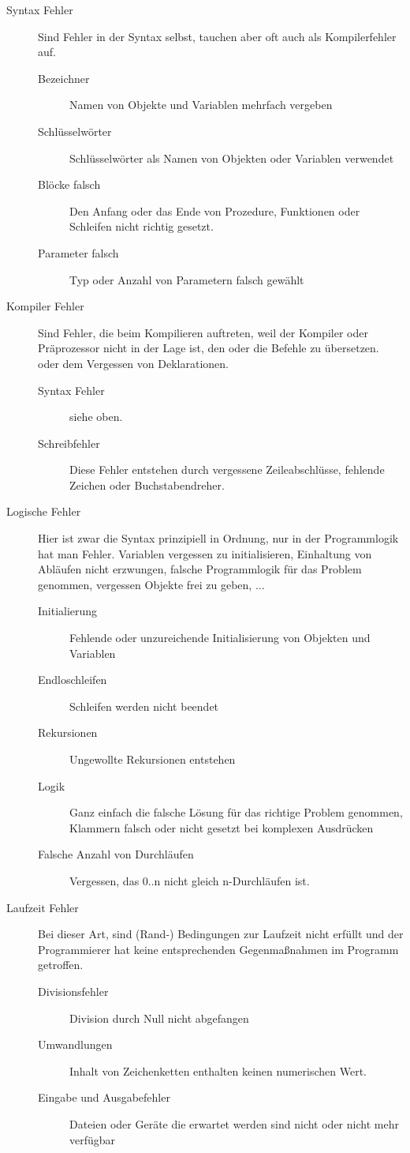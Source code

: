 \begin{description}
  \item[Syntax Fehler] Sind Fehler in der Syntax selbst, tauchen aber oft auch als Kompilerfehler auf.
  \begin{description}
	  \item[Bezeichner] Namen von Objekte und Variablen mehrfach vergeben
	  \item[Schlüsselwörter] Schlüsselwörter als Namen von Objekten oder Variablen verwendet
	  \item[Blöcke falsch] Den Anfang oder das Ende von Prozedure, Funktionen oder Schleifen nicht richtig gesetzt.
	  \item[Parameter falsch] Typ oder Anzahl von Parametern falsch gewählt     
  \end{description}
	\item[Kompiler Fehler] Sind Fehler, die beim Kompilieren auftreten, weil der Kompiler oder Präprozessor nicht in der Lage ist, den oder die Befehle zu übersetzen.  oder dem Vergessen von Deklarationen.
  \begin{description}
	  \item[Syntax Fehler] siehe oben.
	  \item[Schreibfehler] Diese Fehler entstehen durch vergessene Zeileabschlüsse, fehlende Zeichen oder Buchstabendreher.
  \end{description}
  \item[Logische Fehler] Hier ist zwar die Syntax prinzipiell in Ordnung, nur in der Programmlogik hat man Fehler. Variablen vergessen zu initialisieren, Einhaltung von Abläufen nicht erzwungen, falsche Programmlogik für das Problem genommen, vergessen Objekte frei zu geben, ...
  \begin{description}
	  \item[Initialierung] Fehlende oder unzureichende Initialisierung von Objekten und Variablen
	  \item[Endloschleifen] Schleifen werden nicht beendet
	  \item[Rekursionen] Ungewollte Rekursionen entstehen
	  \item[Logik] Ganz einfach die falsche Lösung für das richtige Problem genommen, Klammern falsch oder nicht gesetzt bei komplexen Ausdrücken
	  \item[Falsche Anzahl von Durchläufen] Vergessen, das 0..n nicht gleich n-Durchläufen ist.     
  \end{description}
  \item[Laufzeit Fehler] Bei dieser Art, sind (Rand-) Bedingungen zur Laufzeit nicht erfüllt und der Programmierer hat keine entsprechenden Gegenmaßnahmen im Programm getroffen. 
  \begin{description}
	  \item[Divisionsfehler] Division durch Null nicht abgefangen
	  \item[Umwandlungen] Inhalt von Zeichenketten enthalten keinen numerischen Wert.
	  \item[Eingabe und Ausgabefehler] Dateien oder Geräte die erwartet werden sind nicht oder nicht mehr verfügbar
  \end{description}
\end{description}
